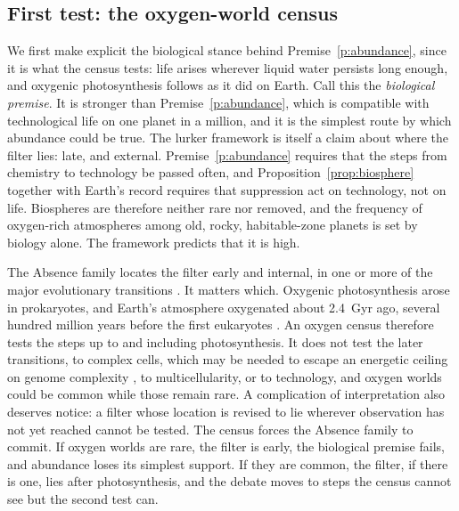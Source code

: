 \documentclass[preprint,12pt]{elsarticle}
\theoremstyle{definition}
\begin{document}
\subsection{First test: the oxygen-world census}
\label{sec:oxygen}

We first make explicit the biological stance behind Premise~\ref{p:abundance}, since it is what the census tests: life arises wherever liquid water persists long enough, and oxygenic photosynthesis follows as it did on Earth. Call this the \emph{biological premise}. It is stronger than Premise~\ref{p:abundance}, which is compatible with technological life on one planet in a million, and it is the simplest route by which abundance could be true. The lurker framework is itself a claim about where the filter lies: late, and external. Premise~\ref{p:abundance} requires that the steps from chemistry to technology be passed often, and Proposition~\ref{prop:biosphere} together with Earth's record requires that suppression act on technology, not on life. Biospheres are therefore neither rare nor removed, and the frequency of oxygen-rich atmospheres among old, rocky, habitable-zone planets is set by biology alone. The framework predicts that it is high.

The Absence family locates the filter early and internal, in one or more of the major evolutionary transitions \citep{MaynardSmith1995}. It matters which. Oxygenic photosynthesis arose in prokaryotes, and Earth's atmosphere oxygenated about 2.4~Gyr ago, several hundred million years before the first eukaryotes \citep{Lyons2014}. An oxygen census therefore tests the steps up to and including photosynthesis. It does not test the later transitions, to complex cells, which may be needed to escape an energetic ceiling on genome complexity \citep{LaneMartin2010}, to multicellularity, or to technology, and oxygen worlds could be common while those remain rare. A complication of interpretation also deserves notice: a filter whose location is revised to lie wherever observation has not yet reached cannot be tested. The census forces the Absence family to commit. If oxygen worlds are rare, the filter is early, the biological premise fails, and abundance loses its simplest support. If they are common, the filter, if there is one, lies after photosynthesis, and the debate moves to steps the census cannot see but the second test can.
\end{document}
